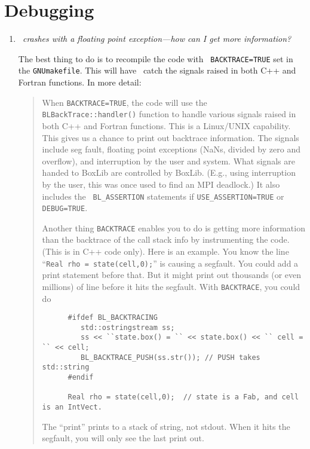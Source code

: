 \section{Debugging}

\begin{enumerate}

\item {\em \castro\ crashes with a floating point exception---how can I get more information?}

  The best thing to do is to recompile the code with {\tt
    BACKTRACE=TRUE} set in the {\tt GNUmakefile}.  This will have \boxlib\
  catch the signals raised in both C++ and Fortran functions.  In more detail:

  \begin{quote}
    When {\tt BACKTRACE=TRUE}, the code will use the {\tt
      BLBackTrace::handler()} function to handle various signals
    raised in both C++ and Fortran functions.  This is a Linux/UNIX
    capability.  This gives us a chance to print out backtrace
    information.  The signals include seg fault, floating point
    exceptions (NaNs, divided by zero and overflow), and interruption
    by the user and system.  What signals are handed to BoxLib are
    controlled by BoxLib.  (E.g., using interruption by the user, this
    was once used to find an MPI deadlock.)  It also includes the {\tt
      BL\_ASSERTION} statements if {\tt USE\_ASSERTION=TRUE} or {\tt
      DEBUG=TRUE}.

    Another thing {\tt BACKTRACE} enables you to do is getting more
    information than the backtrace of the call stack info by
    instrumenting the code.  (This is in C++ code only). Here is an
    example.  You know the line ``{\tt Real rho = state(cell,0);}'' is
    causing a segfault.  You could add a print statement before that.
    But it might print out thousands (or even millions) of line before
    it hits the segfault.  With {\tt BACKTRACE}, you could do

    \begin{verbatim}
      #ifdef BL_BACKTRACING
         std::ostringstream ss;
         ss << ``state.box() = `` << state.box() << `` cell = `` << cell;
         BL_BACKTRACE_PUSH(ss.str()); // PUSH takes std::string
      #endif

      Real rho = state(cell,0);  // state is a Fab, and cell is an IntVect.
    \end{verbatim}

    The ``print'' prints to a stack of string, not stdout.  When it
    hits the segfault, you will only see the last print out.
  \end{quote}



\end{enumerate}
